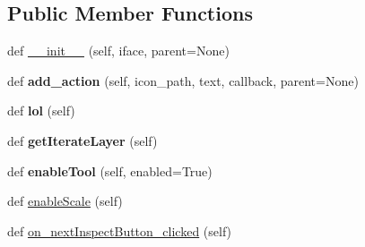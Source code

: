 \subsection*{Public Member Functions}
\begin{DoxyCompactItemize}
\item 
def \mbox{\hyperlink{class_dsg_tools_1_1_production_tools_1_1_inspect_features_1_1inspect_features_1_1_inspect_features_a1f861c35c01fb1ec6b206867f3ac0775}{\+\_\+\+\_\+init\+\_\+\+\_\+}} (self, iface, parent=None)
\item 
\mbox{\label{class_dsg_tools_1_1_production_tools_1_1_inspect_features_1_1inspect_features_1_1_inspect_features_a3e94e570823a27787fbab7ff4ed62096}} 
def {\bfseries add\+\_\+action} (self, icon\+\_\+path, text, callback, parent=None)
\item 
\mbox{\label{class_dsg_tools_1_1_production_tools_1_1_inspect_features_1_1inspect_features_1_1_inspect_features_a52edd5e740fe7c0e60bd3e3294e6bc30}} 
def {\bfseries lol} (self)
\item 
\mbox{\label{class_dsg_tools_1_1_production_tools_1_1_inspect_features_1_1inspect_features_1_1_inspect_features_a10e2913b7518fc2148326304b2f494c6}} 
def {\bfseries get\+Iterate\+Layer} (self)
\item 
\mbox{\label{class_dsg_tools_1_1_production_tools_1_1_inspect_features_1_1inspect_features_1_1_inspect_features_ab2c917d47d6e4f6a6433ba6f53bf58c2}} 
def {\bfseries enable\+Tool} (self, enabled=True)
\item 
def \mbox{\hyperlink{class_dsg_tools_1_1_production_tools_1_1_inspect_features_1_1inspect_features_1_1_inspect_features_a4895b41587166867074d29d9667b382b}{enable\+Scale}} (self)
\item 
def \mbox{\hyperlink{class_dsg_tools_1_1_production_tools_1_1_inspect_features_1_1inspect_features_1_1_inspect_features_ad96ff70d42b8067fc3edadd1e92127b0}{on\+\_\+next\+Inspect\+Button\+\_\+clicked}} (self)
\item 

\end{DoxyCompactItemize}
